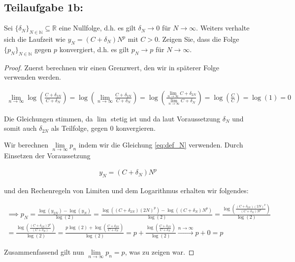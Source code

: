 \documentclass[]{article}
\begin{document}
\subsection*{Teilaufgabe 1b:}
Sei $\{\delta_N\}_{N \in \mathbb{N}} \subseteq \mathbb{R}$ eine Nullfolge, d.h. es gilt $\delta_N \rightarrow 0$ für $N \rightarrow \infty$. Weiters verhalte sich die Laufzeit wie $y_N = (C+\delta_N)N^p$ mit $C > 0$. Zeigen Sie, dass die Folge $\{p_N\}_{N \in \mathbb{N}}$ gegen $p$ konvergiert, d.h. es gilt $p_N \rightarrow p$ für $N \rightarrow \infty$.

\begin{proof}	
	Zuerst berechnen wir einen Grenzwert, den wir in späterer Folge verwenden werden.
	
	\begin{align*}
		\lim\limits_{n\rightarrow\infty} \log\left(\frac{C+\delta_{2N}}{C+\delta_N}\right) = \log\left(\lim\limits_{n\rightarrow\infty}\frac{C+\delta_{2N}}{C+\delta_N}\right) = \log\left(\frac{\lim\limits_{n\rightarrow\infty}C+\delta_{2N}}{\lim\limits_{n\rightarrow\infty}C+\delta_N}\right) = \log\left(\frac{C}{C}\right) = \log(1) = 0
	\end{align*}

	Die Gleichungen stimmen, da $\lim$ stetig ist und da laut Voraussetzung $\delta_N$ und somit auch $\delta_{2N}$ als Teilfolge, gegen $0$ konvergieren.

	Wir berechnen $\lim\limits_{n\rightarrow\infty}p_n$ indem wir die Gleichung \ref{eq:def_N} verwenden. Durch Einsetzen der Voraussetzung 
	
	\begin{align*}
		y_N = (C+\delta_N)N^p
	\end{align*}
	
	und den Rechenregeln von Limiten und dem Logarithmus erhalten wir folgendes:

	\begin{align*}
		\implies
		p_N = \frac{\log(y_{2N}) - \log(y_N)}{\log(2)} = \frac{\log((C+\delta_{2N})(2N)^p) - \log((C+\delta_N)N^p)}{\log(2)} = \frac{\log\left(\frac{(C+\delta_{2N})(2N)^p}{(C+\delta_N)N^p}\right)}{\log(2)} \\
		= \frac{\log\left(\frac{(C+\delta_{2N})2^p}{(C+\delta_N)}\right)}{\log(2)} = \frac{p \log(2) + \log\left(\frac{C+\delta_{2N}}{C+\delta_N}\right)}{\log(2)} = p + \frac{\log\left(\frac{C+\delta_{2N}}{C+\delta_N}\right)}{\log(2)} \xrightarrow{n\rightarrow\infty} p + 0 = p
	\end{align*}
	
	Zusammenfassend gilt nun $\lim\limits_{n\rightarrow\infty}p_n = p$, was zu zeigen war.

\end{proof}
\end{document}
